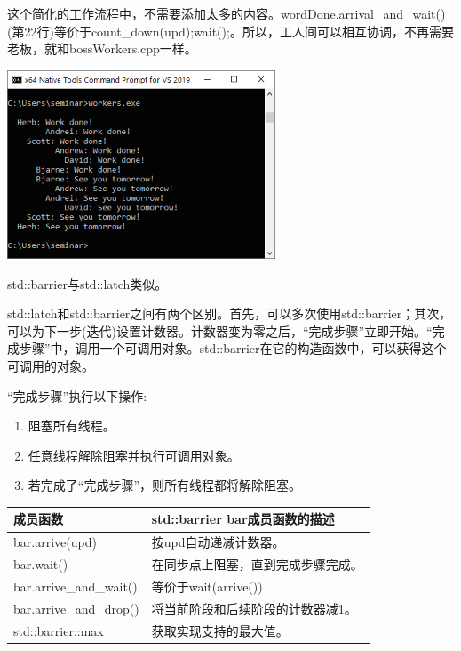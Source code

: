 这个简化的工作流程中，不需要添加太多的内容。wordDone.arrival\_and\_wait()(第22行)等价于count\_down(upd);wait();。所以，工人间可以相互协调，不再需要老板，就和bossWorkers.cpp一样。

\begin{center}
\includegraphics[width=0.6\textwidth]{content/3/chapter6/images/20.png}\\
\end{center}

std::barrier与std::latch类似。


std::latch和std::barrier之间有两个区别。首先，可以多次使用std::barrier；其次，可以为下一步(迭代)设置计数器。计数器变为零之后，“完成步骤”立即开始。“完成步骤”中，调用一个可调用对象。std::barrier在它的构造函数中，可以获得这个可调用的对象。

“完成步骤”执行以下操作:

\begin{enumerate}
\item 
阻塞所有线程。

\item 
任意线程解除阻塞并执行可调用对象。

\item 
若完成了“完成步骤”，则所有线程都将解除阻塞。
\end{enumerate}

\begin{table}[H]
\centering
\begin{tabular}{ll}
\textbf{成员函数}         & \textbf{std::barrier bar成员函数的描述}                                   \\ \hline
bar.arrive(upd)         & 按upd自动递减计数器。         \\
bar.wait()              & 在同步点上阻塞，直到完成步骤完成。  \\
bar.arrive\_and\_wait() & 等价于wait(arrive())                  \\
bar.arrive\_and\_drop() & 将当前阶段和后续阶段的计数器减1。 \\
std::barrier::max       & 获取实现支持的最大值。
\end{tabular}
\end{table}


